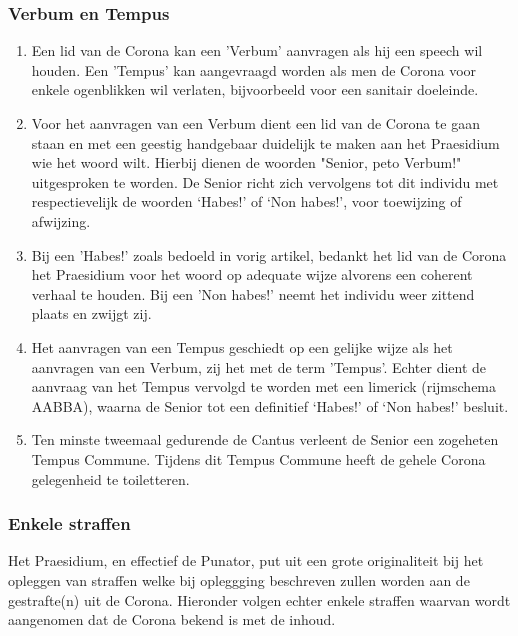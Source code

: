 \subsubsection*{Verbum en Tempus}
\begin{enumerate}
    \item Een lid van de Corona kan een 'Verbum' aanvragen als hij een speech wil houden. Een 'Tempus' kan aangevraagd worden als men de Corona voor enkele ogenblikken wil verlaten, bijvoorbeeld voor een sanitair doeleinde.
    \item Voor het aanvragen van een Verbum dient een lid van de Corona te gaan staan en met een geestig handgebaar duidelijk te maken aan het Praesidium wie het woord wilt. Hierbij dienen de woorden "Senior, peto Verbum!" uitgesproken te worden. De Senior richt zich vervolgens tot dit individu met respectievelijk de woorden ‘Habes!’ of ‘Non habes!’, voor toewijzing of afwijzing.
    \item Bij een 'Habes!' zoals bedoeld in vorig artikel, bedankt het lid van de Corona het Praesidium voor het woord op adequate wijze alvorens een coherent verhaal te houden. Bij een 'Non habes!' neemt het individu weer zittend plaats en zwijgt zij. 
    \item Het aanvragen van een Tempus geschiedt op een gelijke wijze als het aanvragen van een Verbum, zij het met de term 'Tempus'. Echter dient de aanvraag van het Tempus vervolgd te worden met een limerick (rijmschema AABBA), waarna de Senior tot een definitief ‘Habes!’ of ‘Non habes!’ besluit. 
    \item Ten minste tweemaal gedurende de Cantus verleent de Senior een zogeheten Tempus Commune. Tijdens dit Tempus Commune heeft de gehele Corona gelegenheid te toiletteren. 
\end{enumerate}

\subsubsection*{Enkele straffen}
Het Praesidium, en effectief de Punator, put uit een grote originaliteit bij het opleggen van straffen welke bij opleggging beschreven zullen worden aan de gestrafte(n) uit de Corona. Hieronder volgen echter enkele straffen waarvan wordt aangenomen dat de Corona bekend is met de inhoud.

